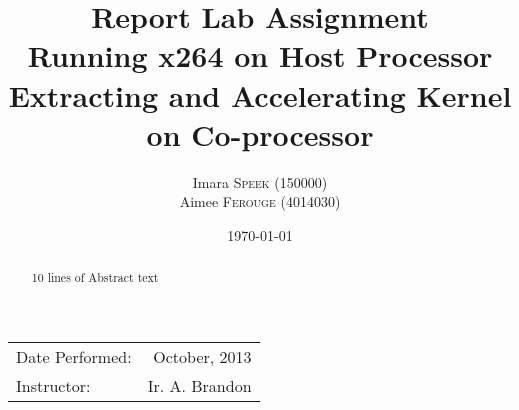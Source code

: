 \documentclass{article}
\title{Report Lab Assignment \\ Running x264 on Host Processor\\ Extracting and Accelerating Kernel on Co-processor} %
\author{Imara \textsc{Speek} (150000)\\ Aimee \textsc{Ferouge} (4014030)} %
\date{\today} %
\begin{document}
\maketitle %

\begin{center}
\begin{tabular}{l r}
Date Performed: & October, 2013 \\ %
Instructor: & Ir. A. Brandon %
\end{tabular}
\end{center}

 \begin{abstract}
 10 lines of Abstract text
 \end{abstract}



 



%
%
%
%
%
\end{document}
